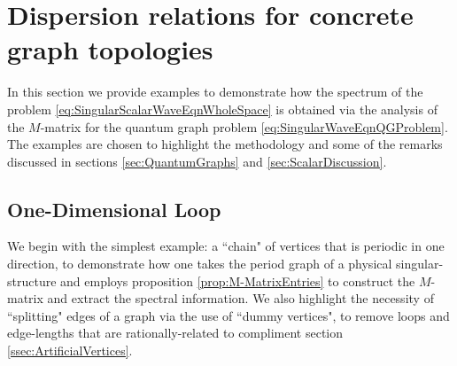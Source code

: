 \section{Dispersion relations for concrete graph topologies} \label{sec:ScalarExamples}
In this section we provide examples to demonstrate how the spectrum of the problem \eqref{eq:SingularScalarWaveEqnWholeSpace} is obtained via the analysis of the $M$-matrix for the quantum graph problem \eqref{eq:SingularWaveEqnQGProblem}.
The examples are chosen to highlight the methodology and some of the remarks discussed in sections \ref{sec:QuantumGraphs} and \ref{sec:ScalarDiscussion}.

\subsection{One-Dimensional Loop} \label{ssec:Example1DLoop}
We begin with the simplest example: a ``chain" of vertices that is periodic in one direction, to demonstrate how one takes the period graph of a physical singular-structure and employs proposition \ref{prop:M-MatrixEntries} to construct the $M$-matrix and extract the spectral information.
We also highlight the necessity of ``splitting" edges of a graph via the use of ``dummy vertices", to remove loops and edge-lengths that are rationally-related to compliment section \ref{ssec:ArtificialVertices}.

